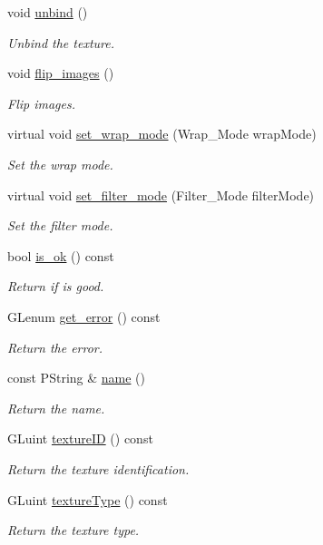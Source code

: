 \begin{DoxyCompactItemize}
void \mbox{\hyperlink{classprz_1_1_texture_a55ae7e8c1e609b7d0e911c69e3614840}{unbind}} ()
\begin{DoxyCompactList}\small\item\em Unbind the texture. \end{DoxyCompactList}\item 
void \mbox{\hyperlink{classprz_1_1_texture_a22bb0df706f6b81f8a908708a724e67c}{flip\+\_\+images}} ()
\begin{DoxyCompactList}\small\item\em Flip images. \end{DoxyCompactList}\item 
virtual void \mbox{\hyperlink{classprz_1_1_texture_afeecdb8009467fd3600c14272f9d887e}{set\+\_\+wrap\+\_\+mode}} (Wrap\+\_\+\+Mode wrap\+Mode)
\begin{DoxyCompactList}\small\item\em Set the wrap mode. \end{DoxyCompactList}\item 
virtual void \mbox{\hyperlink{classprz_1_1_texture_ad149ad868fd8a2d139b7e69ba7b1936f}{set\+\_\+filter\+\_\+mode}} (Filter\+\_\+\+Mode filter\+Mode)
\begin{DoxyCompactList}\small\item\em Set the filter mode. \end{DoxyCompactList}\item 
bool \mbox{\hyperlink{classprz_1_1_texture_a25f1084494684ad127094b7a48a5c003}{is\+\_\+ok}} () const
\begin{DoxyCompactList}\small\item\em Return if is good. \end{DoxyCompactList}\item 
G\+Lenum \mbox{\hyperlink{classprz_1_1_texture_a039881cbfc129c8bc3a1b3ec96ea18f1}{get\+\_\+error}} () const
\begin{DoxyCompactList}\small\item\em Return the error. \end{DoxyCompactList}\item 
const P\+String \& \mbox{\hyperlink{classprz_1_1_texture_ad6163bf48f820adc4665d227bcd5c258}{name}} ()
\begin{DoxyCompactList}\small\item\em Return the name. \end{DoxyCompactList}\item 
G\+Luint \mbox{\hyperlink{classprz_1_1_texture_a5d49295c73908a7e2962ec71f8f72bcb}{texture\+ID}} () const
\begin{DoxyCompactList}\small\item\em Return the texture identification. \end{DoxyCompactList}\item 
G\+Luint \mbox{\hyperlink{classprz_1_1_texture_a3cdf458e7d2adefec6da4cde932cf775}{texture\+Type}} () const
\begin{DoxyCompactList}\small\item\em Return the texture type. \end{DoxyCompactList}\end{DoxyCompactItemize}
